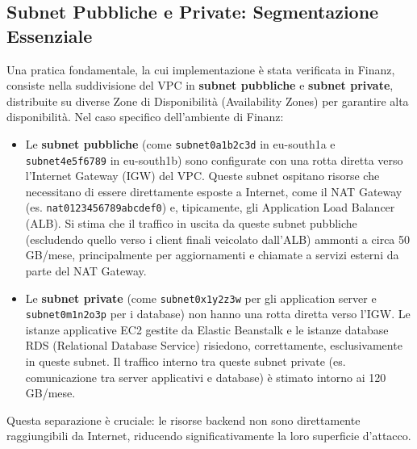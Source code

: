 \subsection{Subnet Pubbliche e Private: Segmentazione Essenziale}
\label{subsec:subnets_cap2}
Una pratica fondamentale, la cui implementazione è stata verificata in Finanz, consiste nella suddivisione del VPC in \textbf{subnet pubbliche} e \textbf{subnet private}, distribuite su diverse Zone di Disponibilità (Availability Zones) per garantire alta disponibilità. Nel caso specifico dell'ambiente di Finanz:
\begin{itemize}
\item Le \textbf{subnet pubbliche} (come \texttt{subnet\discretionary{-}{}{-}0a1b2c3d} in eu-south\discretionary{-}{}{-}1a e \texttt{subnet\discretionary{-}{}{-}4e5f6789} in eu-south\discretionary{-}{}{-}1b) sono configurate con una rotta diretta verso l'Internet Gateway (IGW) del VPC. 
Queste subnet ospitano risorse che necessitano di essere direttamente esposte a Internet, come il NAT Gateway (es. \texttt{nat\discretionary{-}{}{-}0123456789abcdef0}) e, tipicamente, gli Application Load Balancer (ALB). 
Si stima che il traffico in uscita da queste subnet pubbliche (escludendo quello verso i client finali veicolato dall'ALB) ammonti a circa 50 GB/mese, principalmente per aggiornamenti e chiamate a servizi esterni da parte del NAT Gateway.
\item Le \textbf{subnet private} (come \texttt{subnet\discretionary{-}{}{-}0x1y2z3w} per gli application server e \texttt{subnet\discretionary{-}{}{-}0m1n2o3p} per i database) non hanno una rotta diretta verso l'IGW. Le istanze applicative EC2 gestite da Elastic Beanstalk e le istanze database RDS (Relational Database Service) risiedono, correttamente, esclusivamente in queste subnet. Il traffico interno tra queste subnet private (es. comunicazione tra server applicativi e database) è stimato intorno ai 120 GB/mese.
\end{itemize}
Questa separazione è cruciale: le risorse backend non sono direttamente raggiungibili da Internet, riducendo significativamente la loro superficie d'attacco.

